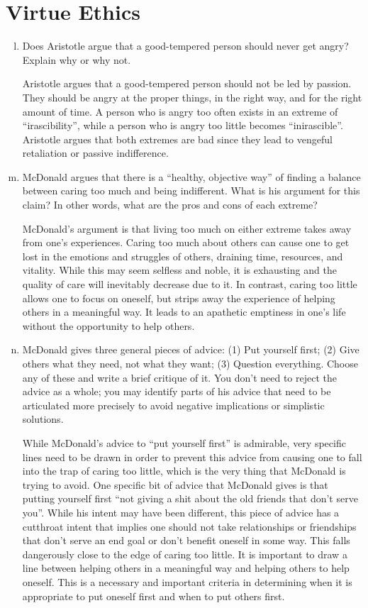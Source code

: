 \documentclass{article}
\begin{document}
\section*{Virtue Ethics}
\begin{enumerate}[a)]
  \setcounter{enumi}{11}
  \item Does Aristotle argue that a good-tempered person should never get angry? Explain why or why not.
  \par Aristotle argues that a good-tempered person should not be led by passion. They should be angry at the proper things, in the right way, and for the right amount of time. A person who is angry too often exists in an extreme of ``irascibility'', while a person who is angry too little becomes ``inirascible''. Aristotle argues that both extremes are bad since they lead to vengeful retaliation or passive indifference.
  \item McDonald argues that there is a ``healthy, objective way'' of finding a balance between caring too much and being indifferent. What is his argument for this claim? In other words, what are the pros and cons of each extreme?
  \par McDonald's argument is that living too much on either extreme takes away from one's experiences. Caring too much about others can cause one to get lost in the emotions and struggles of others, draining time, resources, and vitality. While this may seem selfless and noble, it is exhausting and the quality of care will inevitably decrease due to it. In contrast, caring too little allows one to focus on oneself, but strips away the experience of helping others in a meaningful way. It leads to an apathetic emptiness in one's life without the opportunity to help others.
  \item McDonald gives three general pieces of advice: (1) Put yourself first; (2) Give others what they need, not what they want; (3) Question everything. Choose any of these and write a brief critique of it. You don’t need to reject the advice as a whole; you may identify parts of his advice that need to be articulated more precisely to avoid negative implications or simplistic solutions.
  \par While McDonald's advice to ``put yourself first'' is admirable, very specific lines need to be drawn in order to prevent this advice from causing one to fall into the trap of caring too little, which is the very thing that McDonald is trying to avoid. One specific bit of advice that McDonald gives is that putting yourself first ``not giving a shit about the old friends that don't serve you''. While his intent may have been different, this piece of advice has a cutthroat intent that implies one should not take relationships or friendships that don't serve an end goal or don't benefit oneself in some way. This falls dangerously close to the edge of caring too little. It is important to draw a line between helping others in a meaningful way and helping others to help oneself. This is a necessary and important criteria in determining when it is appropriate to put oneself first and when to put others first.
\end{enumerate}
\end{document}
